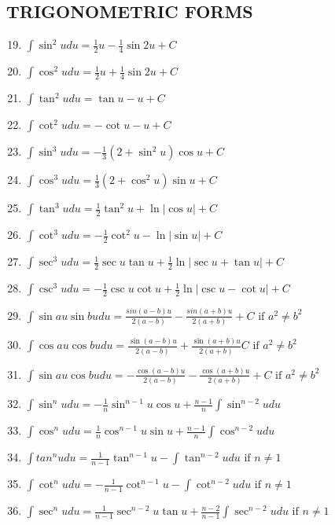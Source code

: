 \documentclass[10pt, letterpaper]{article}
\begin{document}
\subsection{TRIGONOMETRIC FORMS}
\begin{enumerate}
	\setcounter{enumi}{18}
	\item $\int \limits \sin ^2 u du = \frac{1}{2} u - \frac{1}{4} \sin 2u + C$
	\item $\int \limits \cos ^2 u du = \frac{1}{2} u + \frac{1}{4} \sin 2u + C$
	\item $\int \limits \tan ^2 u du = \tan u - u + C$
	\item $\int \limits \cot ^2 u du = -\cot u - u + C$
	\item $\int \limits \sin ^3 u du = -\frac{1}{3} (2 + \sin ^2 u) \cos u + C$
	\item $\int \limits \cos ^3 u du = \frac{1}{3} (2 + \cos ^2 u) \sin u + C$
	\item $\int \limits \tan ^3 u du = \frac{1}{2} \tan ^2 u + \ln | \cos u | + C$
	\item $\int \limits \cot ^3 u du = -\frac{1}{2} \cot ^2 u - \ln | \sin u | + C$
	\item $\int \limits \sec ^3 u du = \frac{1}{2} \sec u \tan u + \frac{1}{2} \ln | \sec u + \tan u | + C$
	\item $\int \limits \csc ^3 u du = -\frac{1}{2} \csc u \cot u + \frac{1}{2} \ln | \csc u - \cot u | + C$
	\item $\int \limits \sin a u \sin bu du = \frac{sin(a-b)u}{2(a-b)} - \frac{sin(a+b)u}{2(a+b)} + C \text{ if } a^2 \neq b^2$
	\item $\int \limits \cos au \cos bu du = \frac{\sin (a-b) u}{2(a-b)} + \frac{\sin (a+b) u}{2(a+b)} C \text{ if } a^2 \neq b^2$
	\item $\int \limits \sin au \cos bu du = -\frac{\cos (a-b) u}{2(a-b)} - \frac{\cos (a+b) u}{2(a+b)} + C \text{ if } a^2 \neq b^2$
	\item $\int \limits \sin ^n u du = -\frac{1}{n} \sin ^{n-1} u \cos u + \frac{n-1}{n} \int \limits \sin ^{n-2} u du$
	\item $\int \limits \cos ^n u du = \frac{1}{n} \cos ^{n-1} u \sin u + \frac{n-1}{n} \int \limits \cos ^{n-2} u du$
	\item $\int \limits tan ^n u du = \frac{1}{n-1} \tan ^{n-1} u - \int \limits \tan ^{n-2} u du \text{ if } n \neq 1$
	\item $\int \limits \cot ^n u du = -\frac{1}{n-1} \cot ^{n-1} u - \int \limits \cot ^{n-2} u du \text{ if } n \neq 1$
	\item $\int \limits \sec ^ n u du = \frac{1}{n-1} \sec ^{n-2} u \tan u + \frac{n-2}{n-1} \int \limits \sec ^{n-2} u du \text{ if } n \neq 1$

\end{enumerate}
\end{document}
